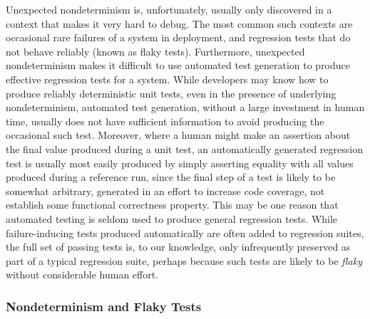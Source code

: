 Unexpected nondeterminism is, unfortunately, usually only discovered
in a context that makes it very hard to debug.   The most common such
contexts are occasional rare failures of a system in deployment, and
regression tests that do not behave reliably (known as flaky tests).
Furthermore, unexpected nondeterminism makes it difficult to use
automated test generation to produce effective regression tests for a
system.  While developers may know how to produce reliably
deterministic unit tests, even in the presence of underlying
nondeterminism, automated test generation, without a large investment
in human time, usually does not have sufficient information to avoid
producing the occasional such test.  Moreover, where a human might
make an assertion about the final value produced during a unit test,
an automatically generated regression test is usually most easily produced by
simply asserting equality with all values produced during a reference
run, since the final step of a test
is likely to be somewhat arbitrary, generated in an effort to increase
code coverage, not establish some functional correctness property.
This may be one reason that automated testing is seldom used to
produce general regression tests.  While failure-inducing tests
produced automatically are often added to regression suites, the full
set of passing tests is, to our knowledge, only infrequently preserved
as part of a typical regression suite, perhaps because such tests are
likely to be \emph{flaky} without considerable human effort.

\subsubsection{Nondeterminism and Flaky Tests}


